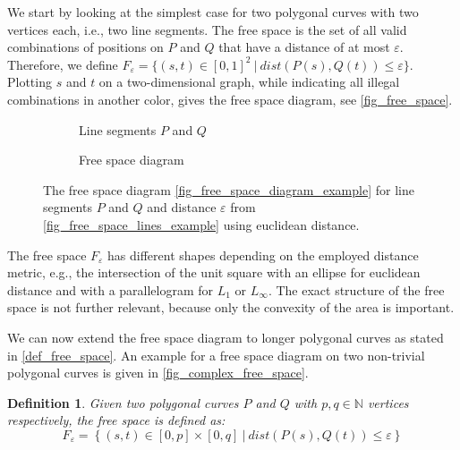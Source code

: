 \documentclass[
oneside,
fontsize=11pt
]{scrartcl}
\newtheorem{mydef}{Definition}
\begin{document}
We start by looking at the simplest case for two polygonal curves with two vertices each, i.e., two line segments.
The free space is the set of all valid combinations of positions on $P$ and $Q$ that have a distance of at most $\varepsilon$.
Therefore, we define $F_\varepsilon = \{(s,t) \in [0,1]^2 \ | \ dist(P(s), Q(t)) \leq \varepsilon \}$.
Plotting $s$ and $t$ on a two-dimensional graph, while indicating all illegal combinations in 
another color, gives the free space diagram, see \autoref{fig_free_space}. \cite{alt_computing_1995}

\begin{figure}[ht]
  \centering
  \begin{subfigure}[b]{0.45\textwidth}
      \resizebox{\textwidth}{!}{
        
      }
      \caption{Line segments $P$ and $Q$}
      \label{fig_free_space_lines_example}
  \end{subfigure}
  \hfill
  \begin{subfigure}[b]{0.45\textwidth}
      \resizebox{\textwidth}{!}{
        
      }
      \caption{Free space diagram}
      \label{fig_free_space_diagram_example}
  \end{subfigure}
  \caption[Free space diagram example]{
    The free space diagram \autoref{fig_free_space_diagram_example} 
    for line segments $P$ and $Q$ and distance $\varepsilon$
    from \autoref{fig_free_space_lines_example} using euclidean distance.}
  \label{fig_free_space}
\end{figure}

The free space $F_\varepsilon$ has different shapes depending on the employed distance metric,
e.g.,  the intersection of the unit square with an ellipse for euclidean distance 
and with a parallelogram for $L_1$ or $L_\infty$. 
The exact structure of the free space is not further relevant, 
because only the convexity of the area is important. \cite{alt_computing_1995}

We can now extend the free space diagram to longer polygonal curves 
as stated in \autoref{def_free_space}.
An example for a free space diagram on two non-trivial polygonal curves is given in \autoref{fig_complex_free_space}.

\begin{mydef}
  \label{def_free_space}
  Given two polygonal curves $P$ and $Q$ with $p,q \in \mathbb{N}$ vertices respectively, 
  the free space is defined as:
  $$F_\varepsilon = \left\{ (s,t) \in [0,p] \times [0,q] \ | \ dist(P(s), Q(t)) \leq \varepsilon \right\}$$
\end{mydef}
\end{document}

